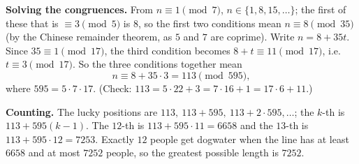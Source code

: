 \textbf{Solving the congruences.} From $n\equiv1\pmod7$, $n\in\{1,8,15,\dots\}$; the first of these that is $\equiv3\pmod5$ is $8$, so the first two conditions mean $n\equiv8\pmod{35}$ (by the Chinese remainder theorem, as $5$ and $7$ are coprime). Write $n=8+35t$. Since $35\equiv1\pmod{17}$, the third condition becomes $8+t\equiv11\pmod{17}$, i.e. $t\equiv3\pmod{17}$. So the three conditions together mean
\[n\equiv8+35\cdot3=113\pmod{595},\]
where $595=5\cdot7\cdot17$. (Check: $113=5\cdot22+3=7\cdot16+1=17\cdot6+11$.)

\textbf{Counting.} The lucky positions are $113,\ 113+595,\ 113+2\cdot595,\dots$; the $k$-th is $113+595(k-1)$. The $12$-th is $113+595\cdot11=6658$ and the $13$-th is $113+595\cdot12=7253$. Exactly $12$ people get dogwater when the line has at least $6658$ and at most $7252$ people, so the greatest possible length is $\boxed{7252}$.
